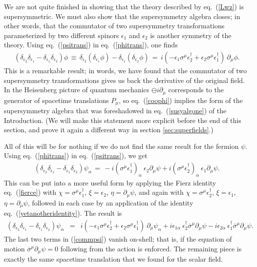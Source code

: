 \documentclass[12pt]{article}
\def\BDpos{}
\def\BDpos{-}
\def\BDpos{\oplus}
\def\BDpos{\ominus}
\def\beq{\begin{eqnarray}}
\def\eeq{\end{eqnarray}}
\def\sigmabar{\overline\sigma}
\begin{document}
We are not quite finished in showing that the theory described by
eq.~(\ref{Lwz}) is supersymmetric. We must also show that the
supersymmetry algebra closes; in other words, that the commutator of two
supersymmetry transformations parameterized by two different spinors
$\epsilon_1$ and $\epsilon_2$ is another symmetry of the theory. Using
eq.~(\ref{psitrans}) in eq.~(\ref{phitrans}), one finds
\beq
(\delta_{\epsilon_2} \delta_{\epsilon_1} -
\delta_{\epsilon_1} \delta_{\epsilon_2}) \phi 
\,\equiv\,
\delta_{\epsilon_2} (\delta_{\epsilon_1} \phi) -
\delta_{\epsilon_1} (\delta_{\epsilon_2} \phi) 
\,=\,
i (- \epsilon_1 \sigma^\mu \epsilon_2^\dagger 
   + \epsilon_2 \sigma^\mu \epsilon_1^\dagger)\> \partial_\mu \phi
. \label{coophi}
\eeq
This is a remarkable result; in words, we have found that the commutator
of two supersymmetry transformations gives us back the derivative of the
original field. In the Heisenberg picture of quantum mechanics
$\BDpos i\partial_\mu$ corresponds to the generator of
spacetime translations $P_\mu$, so eq.~(\ref{coophi}) implies the form of the
supersymmetry algebra that was foreshadowed in eq.~(\ref{susyalgone}) of
the Introduction. (We will make this statement more explicit before the
end of this section, and prove it again a different way in section \ref{sec:superfields}.)

All of this will be for nothing if we do not find the same result for the
fermion $\psi$. Using eq.~(\ref{phitrans}) in eq.~(\ref{psitrans}), we get
\beq
(\delta_{\epsilon_2} \delta_{\epsilon_1} -
\delta_{\epsilon_1} \delta_{\epsilon_2}) \psi_\alpha 
\,=\,
-i(\sigma^\mu\epsilon_1^\dagger)_\alpha\>  \epsilon_2 \partial_\mu\psi  
+i(\sigma^\mu\epsilon_2^\dagger)_\alpha \> \epsilon_1 \partial_\mu\psi
{}.
\eeq
This can be put into a more useful form by applying the Fierz identity
eq.~(\ref{fierce})
with $\chi = \sigma^\mu \epsilon_1^\dagger$,
$\xi = \epsilon_{2} $, $\eta = \partial_\mu \psi$, and again with
$\chi = \sigma^\mu \epsilon_2^\dagger$,
$\xi = \epsilon_{1} $, $\eta = \partial_\mu \psi$, followed
in each case by an application
of the identity eq.~(\ref{yetanotheridentity}). The result is
\beq
(\delta_{\epsilon_2} \delta_{\epsilon_1} -
\delta_{\epsilon_1} \delta_{\epsilon_2}) \psi_\alpha 
& = &
 i (-\epsilon_1 \sigma^\mu \epsilon_2^\dagger 
    +\epsilon_2 \sigma^\mu \epsilon_1^\dagger) \> \partial_\mu \psi_\alpha
+ i \epsilon_{1\alpha} \> \epsilon_2^\dagger \sigmabar^\mu \partial_\mu\psi
- i \epsilon_{2\alpha} \> \epsilon_1^\dagger \sigmabar^\mu 
\partial_\mu\psi
{}.\phantom{xxxxx}
\label{commpsi}
\eeq
The last two terms in (\ref{commpsi}) vanish on-shell; that is, if the
equation of motion $\sigmabar^\mu\partial_\mu \psi = 0$ following from the
action is enforced. The remaining piece is exactly the same spacetime
translation that we found for the scalar field.
\end{document}
